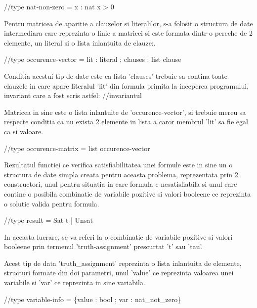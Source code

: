 //type nat-non-zero = x : nat {x > 0}


Pentru matricea de aparitie a clauzelor si literalilor, s-a folosit o structura de date intermediara care reprezinta o linie a matricei si este formata dintr-o pereche de 2 elemente, un literal si o lista inlantuita de clauze:.

//type occurence-vector = {lit : literal ; clauses : list clause}

Conditia acestui tip de date este ca lista 'clauses' trebuie sa contina toate clauzele in care apare literalul 'lit' din formula primita la inceperea programului, invariant care a fost scris astfel:
//invariantul

Matricea in sine este o lista inlantuite de 'occurence-vector', si trebuie mereu sa respecte conditia ca nu exista 2 elemente in lista a caror membrul 'lit' sa fie egal ca si valoare.

//type occurence-matrix = list occurence-vector


Rezultatul functiei ce verifica satisfiabilitatea unei formule este in sine un o structura de date simpla creata pentru aceasta problema, reprezentata prin 2 constructori, unul pentru situatia in care formula e nesatisfiabila si unul care contine o posibila combinatie de variabile pozitive si valori booleene ce reprezinta o solutie valida pentru formula. 

//type result = Sat t | Unsat

In aceasta lucrare, se va referi la o combinatie de variabile pozitive si valori booleene prin termenul 'truth-assignment' prescurtat 't' sau 'tau'.

Acest tip de data 'truth\_assignment' reprezinta o lista inlantuita de elemente, structuri formate din doi parametri, unul 'value' ce reprezinta valoarea unei variabile si 'var' ce reprezinta in sine variabila.

//type variable-info = \{value : bool ; var : nat\_not\_zero\}

